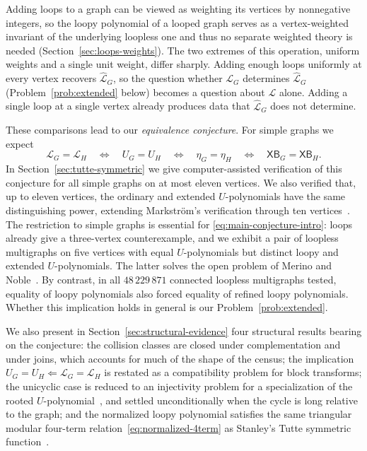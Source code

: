 \documentclass[11pt]{article}
\theoremstyle{plain}
\theoremstyle{definition}
\renewcommand{\mathcal}{\mathscr}
\newcommand{\LL}{\mathcal{L}}    %
\newcommand{\XB}{\mathsf{XB}} %
\numberwithin{equation}{section}
\begin{document}
Adding loops to a graph can be viewed as weighting its vertices by nonnegative integers,
so the loopy polynomial of a looped graph serves as a vertex-weighted invariant of the underlying
loopless one and thus no separate weighted theory is needed (Section~\ref{sec:loops-weights}).
The two extremes of this operation, uniform weights and a single unit weight, differ sharply.
Adding enough loops uniformly at every vertex recovers $\widehat{\LL}_G$, so the question whether
$\LL_G$ determines  $\widehat{\LL}_G$
(Problem~\ref{prob:extended} below) becomes a question about $\LL$ alone.
Adding a single loop at a single vertex already produces data that $\widehat{\LL}_G$ does not determine.
\medskip

 These comparisons lead to our \emph{equivalence conjecture}.
 For simple graphs we expect
\begin{equation}\label{eq:main-conjecture-intro}
   \LL_G=\LL_H
   \quad\Longleftrightarrow\quad
   U_G=U_H
   \quad\Longleftrightarrow\quad
   \eta_G=\eta_H
   \quad\Longleftrightarrow\quad
   \XB_G=\XB_H.
\end{equation}
In Section~\ref{sec:tutte-symmetric} we give computer-assisted verification of this conjecture for
all simple graphs on at most eleven vertices.
We also verified that, up to eleven vertices, the ordinary and extended $U$-polynomials
have the same distinguishing power,
extending Markstr\"om's verification through ten vertices~\cite{Mar}.
The restriction to simple graphs is essential for
\eqref{eq:main-conjecture-intro}: loops already give a three-vertex
counterexample, and we exhibit a pair of loopless multigraphs on five vertices
with equal $U$-polynomials but distinct loopy and extended $U$-polynomials.
The latter solves the open problem of Merino and Noble~\cite{MN}.  By contrast, in
all $48\,229\,871$ connected loopless multigraphs tested, equality of loopy polynomials
also forced equality of refined loopy polynomials.  Whether this implication
holds in general is our Problem~\ref{prob:extended}.

We also present in  Section~\ref{sec:structural-evidence} four structural
results bearing on the conjecture:
the collision classes are closed under complementation and under joins,
which accounts for much of the shape of the census;
the implication $U_G=U_H \Leftarrow \LL_G=\LL_H$
is restated as a compatibility problem for block transforms;
the unicyclic case is reduced to an injectivity problem for a specialization
of the rooted $U$-polynomial~\cite{ADZ}, and settled unconditionally when the cycle is long relative to the graph;
and the normalized loopy polynomial satisfies the same triangular modular four-term
relation~\eqref{eq:normalized-4term} as Stanley's Tutte symmetric function~\cite{OS}.
\end{document}
